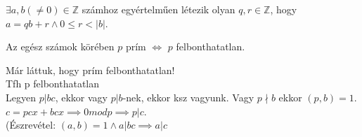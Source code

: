 \begin{frame}
\begin{tcolorbox}[title={Def.: Legnagyobb közös osztó}]
\end{tcolorbox}
\end{frame}

\begin{frame}
\begin{tcolorbox}[title={Tétel: Maradékos osztás $\mathbb{Z}$-ben}]
${\exists}a, b({\neq}0) \in \mathbb{Z}$ számhoz egyértelműen létezik olyan $q, r \in \mathbb{Z}$, hogy\\
$a = qb + r \land 0 \leq r < |b|$.
\end{tcolorbox}
\end{frame}

\begin{frame}
\begin{tcolorbox}[title={Tétel: Prím és irreducibilis elem $\mathbb{Z}$-ben}]
Az egész számok körében $p$ prím $\iff$ $p$ felbonthatatlan.
\end{tcolorbox}

\begin{tcolorbox}[title={Bizonyítás}]
Már láttuk, hogy prím felbonthatatlan!\\
Tfh p felbonthatatlan\\
Legyen $p|bc$, ekkor vagy $p | b$-nek, ekkor ksz vagyunk.
Vagy $p \nmid b$ ekkor $(p,b) = 1$.\\
$c = pcx +bcx \implies 0 mod p \implies p | c$.\\
(Észrevétel: $(a, b) = 1 \land a | bc \implies a | c$

\end{tcolorbox}

\end{frame}

